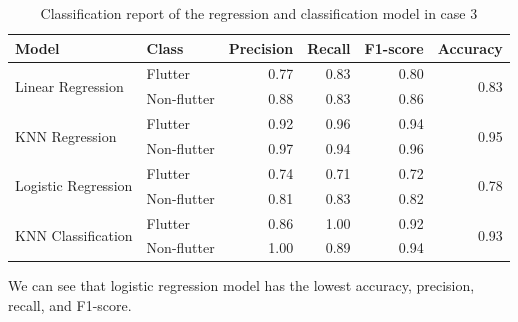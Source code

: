 \documentclass[conf]{new-aiaa}
\begin{document}
\begin{table}[H]
    \centering
    \caption{\label{tab:case3_classification_report}Classification report of the regression and classification model in case 3}
    \begin{tabular}{llrrrr}
        \toprule
        Model                               & Class         &  Precision    &  Recall       &  F1-score     & Accuracy \\
        \midrule
        \multirow{2}{*}{Linear Regression}  & Flutter       &  0.77         &  0.83         &  0.80         &  \multirow{2}{*}{0.83} \\
                                            & Non-flutter   &  0.88         &  0.83         &  0.86         &   \\
        \midrule
        \multirow{2}{*}{KNN Regression}     & Flutter       &  0.92         &  0.96         &  0.94         &  \multirow{2}{*}{0.95} \\
                                            & Non-flutter   &  0.97         &  0.94         &  0.96         &   \\
        \midrule
        \multirow{2}{*}{Logistic Regression} & Flutter       &  0.74         &  0.71         &  0.72         &  \multirow{2}{*}{0.78} \\
                                            & Non-flutter   &  0.81         &  0.83         &  0.82         &   \\
        \midrule
        \multirow{2}{*}{KNN Classification} & Flutter       &  0.86         &  1.00         &  0.92         &  \multirow{2}{*}{0.93} \\
                                            & Non-flutter   &  1.00         &  0.89         &  0.94         &   \\
        \bottomrule
    \end{tabular}
\end{table}
We can see that logistic regression model has the lowest accuracy, precision, recall, and F1-score. 
\end{document}
